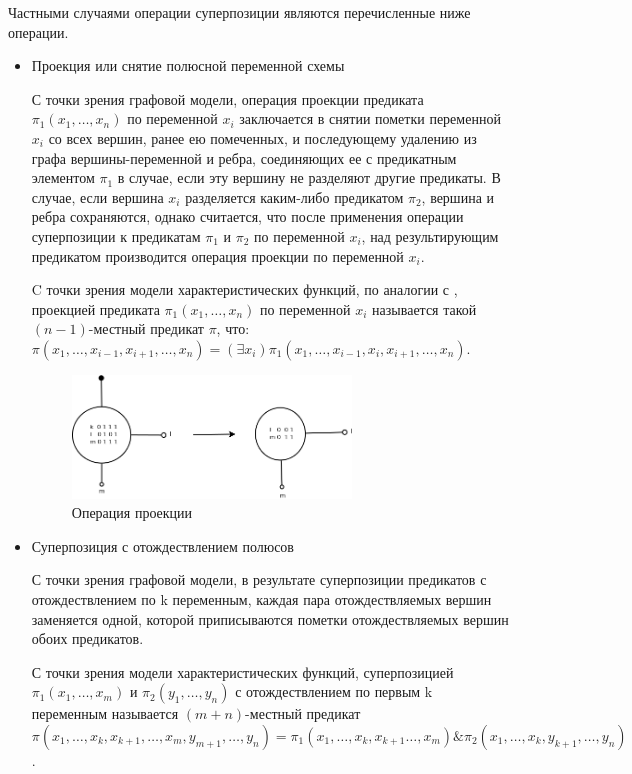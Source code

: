 \documentclass[12pt]{extarticle}
\begin{document}
Частными случаями операции суперпозиции являются перечисленные ниже операции.

\label{operations}
\begin{itemize}
    \item Проекция или снятие полюсной переменной схемы
    
    С точки зрения графовой модели, операция проекции предиката $\pi_1(x_1, \dots, x_n)$ по переменной $x_i$
    заключается в снятии пометки переменной $x_i$ со всех вершин, ранее ею помеченных, и последующему
    удалению из графа вершины-переменной и ребра, соединяющих ее с предикатным элементом $\pi_1$ в случае, если 
    эту вершину не разделяют другие предикаты. В случае, если вершина $x_i$ разделяется каким-либо предикатом $\pi_2$,
    вершина и ребра сохраняются, однако считается, что после применения операции суперпозиции к предикатам 
    $\pi_1$ и $\pi_2$ по переменной $x_i$, над результирующим предикатом
    производится операция проекции по переменной $x_i$.

    C точки зрения модели характеристических функций,
    по аналогии с \cite{Marchenkov}, проекцией предиката $\pi_1(x_1, \dots, x_n)$ по переменной $x_i$ называется такой
    $(n-1)$-местный предикат $\pi$, что:
    $\pi(x_1, \dots, x_{i-1}, x_{i+1}, \dots, x_n) = (\exists x_i) \pi_1(x_1, \dots, x_{i-1}, x_i, x_{i+1}, \dots, x_n)$.

    \begin{figure}[htb]
    \centering
    \includegraphics[width=0.7\textwidth]{project_op.png}
    \caption{Операция проекции}
    \label{fig:project_op}
    \end{figure}

    \item Суперпозиция с отождествлением полюсов

    С точки зрения графовой модели, в результате суперпозиции предикатов с отождествлением по k переменным, каждая пара
    отождествляемых вершин заменяется одной, которой приписываются пометки отождествляемых вершин обоих предикатов.

    С точки зрения модели характеристических функций, 
    суперпозицией $\pi_1(x_1, \dots, x_m)$ и $\pi_2(y_1, \dots, y_n)$ с отождествлением по первым k переменным 
    называется $(m+n)$-местный предикат
    $\pi(x_1, \dots, x_k, x_{k+1}, \dots, x_m, y_{m+1}, \dots, y_n) = \pi_1(x_1, \dots, x_k, x_{k+1} \dots, x_m) \& \pi_2(x_1, \dots, x_k, y_{k+1}, \dots, y_n)$.


\end{itemize}
\end{document}
